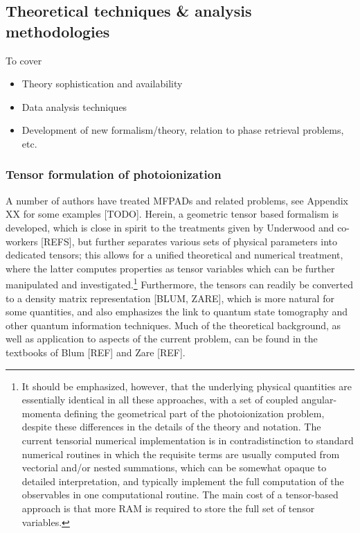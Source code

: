 \subsection{Theoretical techniques \& analysis methodologies}

To cover 

\begin{itemize}
\item Theory sophistication and availability
\item Data analysis techniques
\item Development of new formalism/theory, relation to phase retrieval problems, etc.
\end{itemize}

\subsubsection{Tensor formulation of photoionization}

A number of authors have treated MFPADs and related problems, see Appendix XX for some examples [TODO]. Herein, a geometric tensor based formalism is developed, which is close in spirit to the treatments given by Underwood and co-workers [REFS], but further separates various sets of physical parameters into dedicated tensors; this allows for a unified theoretical and numerical treatment, where the latter computes properties as tensor variables which can be further manipulated and investigated.\footnote{It should be emphasized, however, that the underlying physical quantities are essentially identical in all these approaches, with a set of coupled angular-momenta defining the geometrical part of the photoionization problem, despite these differences in the details of the theory and notation. The current tensorial numerical implementation is in contradistinction to standard numerical routines in which the requisite terms are usually computed from vectorial and/or nested summations, which can be somewhat opaque to detailed interpretation, and typically implement the full computation of the observables in one computational routine. The main cost of a tensor-based approach is that more RAM is required to store the full set of tensor variables.} Furthermore, the tensors can readily be converted to a density matrix representation [BLUM, ZARE], which is more natural for some quantities, and also emphasizes the link to quantum state tomography and other quantum information techniques. Much of the theoretical background, as well as application to aspects of the current problem, can be found in the textbooks of Blum [REF] and Zare [REF].


